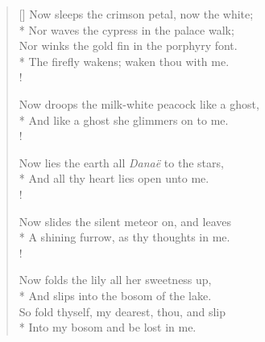 \documentclass[MAIN]{subfiles}
\begin{document}
\settowidth{\versewidth}{Now sleeps the crimson petal, now the white;}
\begin{verse}[\versewidth]
Now sleeps the crimson petal, now the white;\\*
Nor waves the cypress in the palace walk;\\
Nor winks the gold fin in the porphyry font.\\*
The firefly wakens; waken thou with me.\\!

Now droops the milk-white peacock like a ghost,\\*
And like a ghost she glimmers on to me.\\!

Now lies the earth all \emph{Dana\"e} to the stars,\\*
And all thy heart lies open unto me.\\!

Now slides the silent meteor on, and leaves\\*
A shining furrow, as thy thoughts in me.\\!

Now folds the lily all her sweetness up,\\*
And slips into the bosom of the lake.\\
So fold thyself, my dearest, thou, and slip\\*
Into my bosom and be lost in me.
\end{verse}
\end{document}
